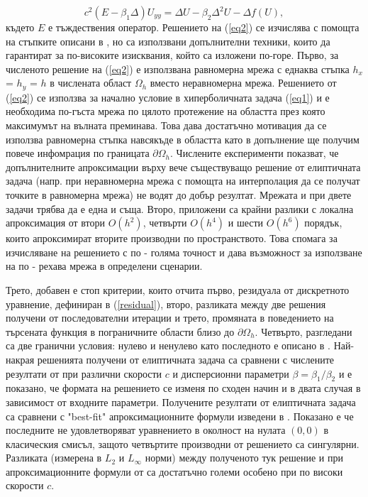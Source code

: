 \documentclass{article}
\newcommand{\rf}[1]{(\ref{#1})}
\begin{document}
\begin{equation}\label{eq2}
c^2 (E-\beta_1 \Delta) U_{yy} = \Delta U -\beta_2 \Delta^2 U - \Delta f(U),
\end{equation}
където $E$ е тъждествения оператор. Решението на \rf{eq2} се изчислява с помощта на стъпките описани в \cite{Ch2012,chd-chr}, но са използвани допълнителни техники, които да гарантират за по-високите изисквания, който са изложени по-горе.
Първо, за численото решение на \rf{eq2} е използвана равномерна мрежа с еднаква стъпка $h_x$ = $h_y$ = $h$ в числената област $\Omega_h$ вместо неравномерна мрежа. Решението от \rf{eq2} се използва за начално условие в хиперболичната задача \rf{eq1} и е необходима по-гъста мрежа по цялото протежение на областта през която максимумът на вълната преминава. Това дава достатъчно мотивация да се използва равномерна стъпка навсякъде в областта като в допълнение ще получим повече инфомрация по границата $\partial \Omega_h$. Числените експерименти показват, че допълнителните апроксимации върху вече съществуващо решение от елиптичната задача (напр. при неравномерна мрежа с помощта на интерполация да се получат точките в равномерна мрежа) не водят до добър резултат. Мрежата и при двете задачи трябва да е една и съща.
Второ, приложени са крайни разлики с локална апроксимация от втори $O(h^2)$, четвърти $O(h^4)$ и шести $O(h^6)$ порядък, които апроксимират вторите производни по пространството. Това спомага за изчисляване на решението с по - голяма точност и дава възможност за използване на по - рехава мрежа в определени сценарии.

Трето, добавен е стоп критерии, които отчита първо, резидуала от дискретното уравнение, дефиниран в \rf{residual}, второ, разликата между две решения получени от последователни итерации и трето, промяната в поведението на търсената функция в пограничните области близо до $\partial \Omega_h$.
Четвърто, разгледани са две гранични условия: нулево и ненулево като последното е описано в \cite{bnd}.
Най-накрая решенията получени от елиптичната задача са сравнени с числените резултати от \cite{Ch2012,Ch2011} при различни скорости $c$ и дисперсионни параметри $\beta =\beta_1  / \beta_2$ и е показано, че формата на решението се изменя по сходен начин и в двата случая в зависимост от входните параметри. Получените резултати от елиптичната задача са сравнени с "best-fit" апроксимационните формули изведени в \cite{Ch2011}. Показано е че последните не удовлетворяват уравнението в околност на нулата $(0,0)$ в класическия смисъл, защото четвъртите производни от решението са сингулярни. Разликата (измерена в $L_2$ и $L_\infty$ норми) между полученото тук решение и при апроксимационните формули от \cite{Ch2011} са достатъчно големи особено при по високи скорости $c$.
\iffalse
\end{document}
